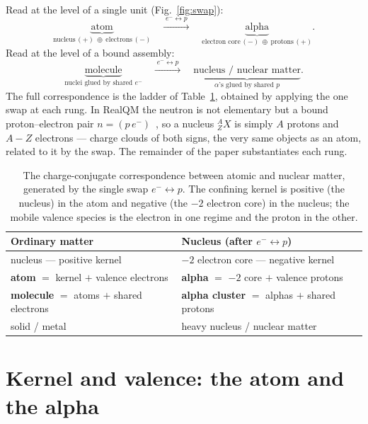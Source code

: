 \documentclass[11pt]{article}
\begin{document}
Read at the level of a single unit (Fig.~\ref{fig:swap}):
\[
\underbrace{\text{atom}}_{\text{nucleus}\,(+)\ \oplus\ \text{electrons}\,(-)}
\quad\xrightarrow{\;e^-\leftrightarrow p\;}\quad
\underbrace{\text{alpha}}_{\text{electron core}\,(-)\ \oplus\ \text{protons}\,(+)} .
\]
Read at the level of a bound assembly:
\[
\underbrace{\text{molecule}}_{\text{nuclei glued by shared }e^-}
\quad\xrightarrow{\;e^-\leftrightarrow p\;}\quad
\underbrace{\text{nucleus / nuclear matter}}_{\alpha\text{'s glued by shared }p} .
\]
The full correspondence is the ladder of Table~\ref{tab:correspondence}, obtained by applying the one
swap at each rung. In RealQM the neutron is not elementary but a bound proton--electron pair
$n=(p\,e^-)$~\cite{Johnson-RealNucleus}, so a nucleus $^{A}_{Z}X$ is simply $A$ protons and $A-Z$
electrons --- charge clouds of both signs, the very same objects as an atom, related to it by the
swap. The remainder of the paper substantiates each rung.

\begin{table}[t]
\centering
\renewcommand{\arraystretch}{1.25}
\begin{tabular}{ll}
\toprule
\textbf{Ordinary matter} & \textbf{Nucleus (after $e^-\!\leftrightarrow p$)}\\
\midrule
nucleus --- positive kernel                      & $-2$ electron core --- negative kernel\\
\textbf{atom} $=$ kernel $+$ valence electrons    & \textbf{alpha} $=$ $-2$ core $+$ valence protons\\
\textbf{molecule} $=$ atoms $+$ shared electrons  & \textbf{alpha cluster} $=$ alphas $+$ shared protons\\
solid / metal                                    & heavy nucleus / nuclear matter\\
\bottomrule
\end{tabular}
\caption{The charge-conjugate correspondence between atomic and nuclear matter, generated by the
single swap $e^-\!\leftrightarrow p$. The confining kernel is positive (the nucleus) in the atom and
negative (the $-2$ electron core) in the nucleus; the mobile valence species is the electron in one
regime and the proton in the other.}
\label{tab:correspondence}
\end{table}

\section{Kernel and valence: the atom and the alpha}
\end{document}
